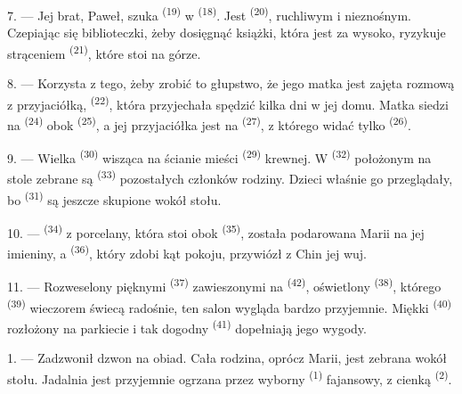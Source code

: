 \VUsaut{5.0mm}
\VUsaut{3.0mm}

7. --- Jej brat, Paweł, szuka  \textsuperscript{(19)} w
 \textsuperscript{(18)}. Jest 
\textsuperscript{(20)}, ruchliwym i nieznośnym. Czepiając się biblioteczki, żeby
dosięgnąć książki, która jest za wysoko, ryzykuje strąceniem 
\textsuperscript{(21)}, które stoi na górze.

8. --- Korzysta z tego, żeby zrobić to głupstwo, że jego matka jest zajęta rozmową z
przyjaciółką,  \textsuperscript{(22)}, która przyjechała spędzić kilka dni w
jej domu. Matka siedzi na  \textsuperscript{(24)} obok 
\textsuperscript{(25)}, a jej przyjaciółka jest na 
\textsuperscript{(27)}, z którego widać tylko  \textsuperscript{(26)}.

9. --- Wielka  \textsuperscript{(30)} wisząca na ścianie mieści
 \textsuperscript{(29)} krewnej. W 
\textsuperscript{(32)} położonym na stole zebrane są 
\textsuperscript{(33)} pozostałych członków rodziny. Dzieci właśnie go przeglądały, bo
 \textsuperscript{(31)} są jeszcze skupione wokół stołu.

10. ---  \textsuperscript{(34)} z porcelany, która stoi obok
 \textsuperscript{(35)}, została podarowana Marii na jej
imieniny, a  \textsuperscript{(36)}, który zdobi kąt pokoju, przywiózł z
Chin jej wuj.

11. --- Rozweselony pięknymi  \textsuperscript{(37)} zawieszonymi na
 \textsuperscript{(42)}, oświetlony 
\textsuperscript{(38)}, którego  \textsuperscript{(39)}
wieczorem świecą radośnie, ten salon wygląda bardzo przyjemnie. Miękki 
\textsuperscript{(40)} rozłożony na parkiecie i tak dogodny  \textsuperscript{(41)} dopełniają jego wygody.

\VUsaut{3.6mm}
\VUsaut{3.0mm}

1. --- Zadzwonił dzwon na obiad. Cała rodzina, oprócz Marii, jest zebrana wokół stołu.
Jadalnia jest przyjemnie ogrzana przez wyborny  \textsuperscript{(1)}
fajansowy, z cienką  \textsuperscript{(2)}.

